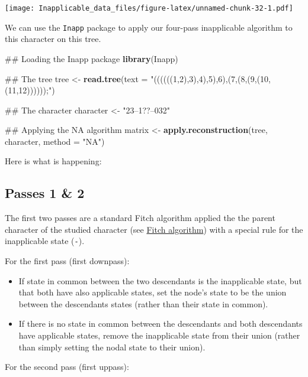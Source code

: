 \documentclass[]{book}
\newenvironment{Shaded}{\begin{snugshade}}{\end{snugshade}}
\newcommand{\KeywordTok}[1]{\textcolor[rgb]{0.13,0.29,0.53}{\textbf{#1}}}
\newcommand{\DataTypeTok}[1]{\textcolor[rgb]{0.13,0.29,0.53}{#1}}
\newcommand{\StringTok}[1]{\textcolor[rgb]{0.31,0.60,0.02}{#1}}
\newcommand{\NormalTok}[1]{#1}
\providecommand{\tightlist}{%
  \setlength{\itemsep}{0pt}\setlength{\parskip}{0pt}}
\theoremstyle{definition}
\theoremstyle{definition}
\theoremstyle{definition}
\theoremstyle{remark}
\begin{document}
\texttt{[image: Inapplicable\_data\_files/figure-latex/unnamed-chunk-32-1.pdf]}

We can use the \texttt{Inapp} package to apply our four-pass
inapplicable algorithm to this character on this tree.

\begin{Shaded}
\begin{Highlighting}[]
\NormalTok{## Loading the Inapp package}
\KeywordTok{library}\NormalTok{(Inapp)}

\NormalTok{## The tree}
\NormalTok{tree <-}\StringTok{ }\KeywordTok{read.tree}\NormalTok{(}\DataTypeTok{text =} \StringTok{"((((((1,2),3),4),5),6),(7,(8,(9,(10,(11,12))))));"}\NormalTok{)}

\NormalTok{## The character}
\NormalTok{character <-}\StringTok{ "23--1??--032"}

\NormalTok{## Applying the NA algorithm}
\NormalTok{matrix <-}\StringTok{ }\KeywordTok{apply.reconstruction}\NormalTok{(tree, character, }\DataTypeTok{method =} \StringTok{"NA"}\NormalTok{)}
\end{Highlighting}
\end{Shaded}

Here is what is happening:

\subsection{Passes 1 \& 2}\label{passes-1-2}

The first two passes are a standard Fitch algorithm applied the the
parent character of the studied character (see
\protect\hyperlink{fitch}{Fitch algorithm}) with a special rule for the
inapplicable state (\texttt{-}).

For the first pass (first downpass):

\begin{itemize}
\tightlist
\item
  If state in common between the two descendants is the inapplicable
  state, but that both have also applicable states, set the node's state
  to be the union between the descendants states (rather than their
  state in common).
\item
  If there is no state in common between the descendants and both
  descendants have applicable states, remove the inapplicable state from
  their union (rather than simply setting the nodal state to their
  union).
\end{itemize}

For the second pass (first uppass):
\end{document}
